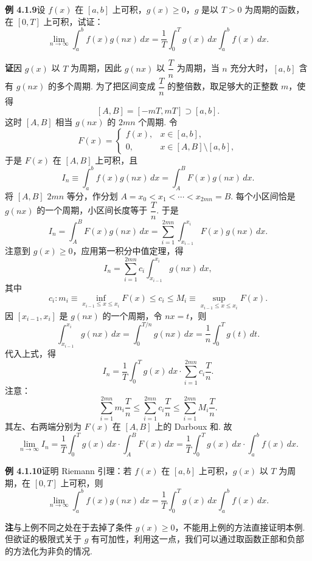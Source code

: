 \documentclass[UTF8,12pt,a4paper,fontset=fandol]{ctexart}
\begin{document}
\noindent\textbf{例 4.1.9}\quad 设 $f(x)$ 在 $[a,b]$ 上可积，$g(x)\ge0$，$g$ 是以 $T>0$ 为周期的函数，在 $[0,T]$ 上可积，试证：
\[
\lim_{n\to\infty}\int_a^b f(x)g(nx)\,dx
=\frac1T\int_0^T g(x)\,dx\int_a^b f(x)\,dx.
\]

\noindent\textbf{证}\quad 因 $g(x)$ 以 $T$ 为周期，因此 $g(nx)$ 以 $\dfrac Tn$ 为周期，当 $n$ 充分大时，$[a,b]$ 含有 $g(nx)$ 的多个周期. 为了把区间变成 $\dfrac Tn$ 的整倍数，取足够大的正整数 $m$，使得
\[
[A,B]=[-mT,mT]\supset[a,b].
\]
这时 $[A,B]$ 相当 $g(nx)$ 的 $2mn$ 个周期. 令
\[
F(x)=
\begin{cases}
f(x), & x\in[a,b],\\
0, & x\in[A,B]\setminus[a,b],
\end{cases}
\]
于是 $F(x)$ 在 $[A,B]$ 上可积，且
\[
I_n\equiv\int_a^b f(x)g(nx)\,dx
=\int_A^B F(x)g(nx)\,dx.
\]
将 $[A,B]$ $2mn$ 等分，作分划 $A=x_0<x_1<\cdots<x_{2mn}=B$. 每个小区间恰是 $g(nx)$ 的一个周期，小区间长度等于 $\dfrac Tn$. 于是
\[
I_n=\int_A^B F(x)g(nx)\,dx
=\sum_{i=1}^{2mn}\int_{x_{i-1}}^{x_i}F(x)g(nx)\,dx.
\]
注意到 $g(x)\ge0$，应用第一积分中值定理，得
\[
I_n=\sum_{i=1}^{2mn}c_i\int_{x_{i-1}}^{x_i}g(nx)\,dx,
\]
其中
\[
c_i:m_i\equiv\inf_{x_{i-1}\le x\le x_i}F(x)
\le c_i\le
M_i\equiv\sup_{x_{i-1}\le x\le x_i}F(x).
\]
因 $[x_{i-1},x_i]$ 是 $g(nx)$ 的一个周期，令 $nx=t$，则
\[
\int_{x_{i-1}}^{x_i}g(nx)\,dx
=\int_0^{T/n}g(nx)\,dx
=\frac1n\int_0^T g(t)\,dt.
\]
代入上式，得
\[
I_n=\frac1T\int_0^Tg(x)\,dx\cdot
\sum_{i=1}^{2mn}c_i\frac Tn.
\]
注意：
\[
\sum_{i=1}^{2mn}m_i\frac Tn
\le \sum_{i=1}^{2mn}c_i\frac Tn
\le \sum_{i=1}^{2mn}M_i\frac Tn.
\]
其左、右两端分别为 $F(x)$ 在 $[A,B]$ 上的 Darboux 和. 故
\[
\lim_{n\to\infty}I_n
=\frac1T\int_0^Tg(x)\,dx\cdot\int_A^B F(x)\,dx
=\frac1T\int_0^Tg(x)\,dx\cdot\int_a^b f(x)\,dx.
\]

\noindent\textbf{例 4.1.10}\quad 证明 Riemann 引理：若 $f(x)$ 在 $[a,b]$ 上可积，$g(x)$ 以 $T$ 为周期，在 $[0,T]$ 上可积，则
\[
\lim_{n\to\infty}\int_a^b f(x)g(nx)\,dx
=\frac1T\int_0^T g(x)\,dx\int_a^b f(x)\,dx.
\]

\noindent\textbf{注}\quad 与上例不同之处在于去掉了条件 $g(x)\ge0$，不能用上例的方法直接证明本例. 但欲证的极限式关于 $g$ 有可加性，利用这一点，我们可以通过取函数正部和负部的方法化为非负的情况.
\end{document}

